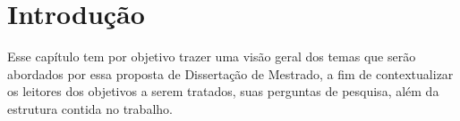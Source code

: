 
\chapter{\textbf{Introdução}}
\label{chap:intro}

Esse capítulo tem por objetivo trazer uma visão geral dos temas que serão abordados por essa proposta de Dissertação de Mestrado, a fim de contextualizar os leitores dos objetivos a serem tratados, suas perguntas de pesquisa, além da estrutura contida no trabalho.






  

 

      


